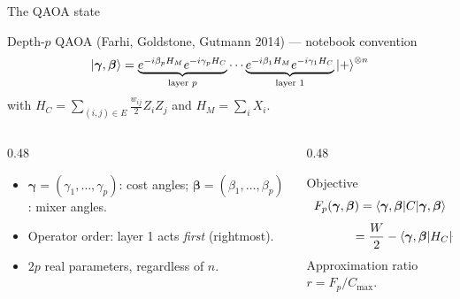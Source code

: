 \documentclass[aspectratio=169,11pt]{beamer}
\newcommand{\bg}{\boldsymbol\gamma}
\newcommand{\bb}{\boldsymbol\beta}
\begin{document}
\begin{frame}{The QAOA state}
  \begin{block}{Depth-$p$ QAOA (Farhi, Goldstone, Gutmann 2014) --- notebook convention}
    \[ \ket{\bg,\bb} = \underbrace{e^{-i\beta_pH_M}e^{-i\gamma_pH_C}}_{\text{layer } p}\cdots
       \underbrace{e^{-i\beta_1H_M}e^{-i\gamma_1H_C}}_{\text{layer } 1}\ket+^{\otimes n} \]
    \centering with $H_C = \sum_{(i,j)\in E}\tfrac{w_{ij}}{2}Z_iZ_j$ and $H_M = \sum_i X_i$.
  \end{block}
  \begin{columns}[T]
    \begin{column}{0.48\textwidth}
      \begin{itemize}
        \item $\bg = (\gamma_1, \dots, \gamma_p)$: cost angles; $\bb = (\beta_1, \dots, \beta_p)$: mixer angles.
        \item Operator order: layer 1 acts \emph{first} (rightmost).
        \item $2p$ real parameters, regardless of $n$.
      \end{itemize}
    \end{column}
    \begin{column}{0.48\textwidth}
      \begin{block}{Objective}
        \[ F_p(\bg,\bb) = \braket{\bg,\bb|C|\bg,\bb} \]
        \[ \phantom{F_p(\bg,\bb)} = \frac W2 - \braket{\bg,\bb|H_C|\bg,\bb} \]
        Approximation ratio $r = F_p/C_{\max}$.
      \end{block}
    \end{column}
  \end{columns}
\end{frame}
\end{document}

